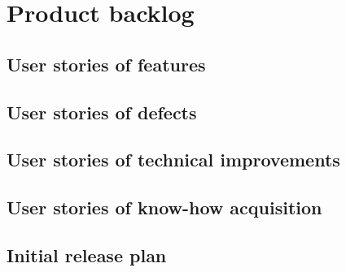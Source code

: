 \chapter{Product backlog}

\section{User stories of features}

\section{User stories of defects}

\section{User stories of technical improvements}

\section{User stories of know-how acquisition}

\section{Initial release plan}